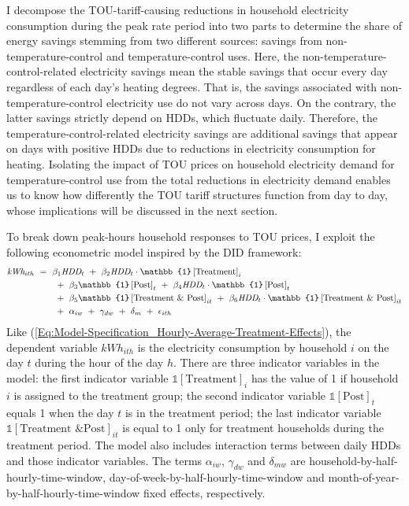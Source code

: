 I decompose the TOU-tariff-causing reductions in household electricity consumption during the peak rate period into two parts to determine the share of energy savings stemming from two different sources: savings from non-temperature-control and temperature-control uses. Here, the non-temperature-control-related electricity savings mean the stable savings that occur every day regardless of each day's heating degrees. That is, the savings associated with non-temperature-control electricity use do not vary across days. On the contrary, the latter savings strictly depend on HDDs, which fluctuate daily. Therefore, the temperature-control-related electricity savings are additional savings that appear on days with positive HDDs due to reductions in electricity consumption for heating. Isolating the impact of TOU prices on household electricity demand for temperature-control use from the total reductions in electricity demand enables us to know how differently the TOU tariff structures function from day to day, whose implications will be discussed in the next section.

To break down peak-hours household responses to TOU prices, I exploit the following econometric model inspired by the DID framework:
\begin{equation}
\begin{split}
    \textit{kWh}_{ith} \ 
    & = \ \beta_{1} \textit{HDD}_{t} \ + \ \beta_{2} \textit{HDD}_{t} \cdot \mathbb{1}\left[ \text{Treatment} \right]_{i} \\ 
    & \hspace{0.7cm} + \ \beta_{3} \mathbb{1}\left[ \text{Post} \right]_{t} \ + \ \beta_{4} \textit{HDD}_{t} \cdot \mathbb{1}\left[ \text{Post} \right]_{t} \\ 
    & \hspace{0.7cm} + \ \beta_{5} \mathbb{1}\left[ \text{Treatment \& Post} \right]_{it} \ + \ \beta_{6} \textit{HDD}_{t} \cdot \mathbb{1}\left[ \text{Treatment \& Post} \right]_{it} \\ 
    & \hspace{0.7cm} + \ \alpha_{iw} \ + \ \gamma_{dw} \ + \ \delta_{m} \ + \ \epsilon_{ith}
\end{split}
\label{Eq:Model-Specification_Breakdown-of-Hourly-Average-Treatment-Effect}
\end{equation}
Like (\ref{Eq:Model-Specification_Hourly-Average-Treatment-Effects}), the dependent variable $kWh_{ith}$ is the electricity consumption by household $i$ on the day $t$ during the hour of the day $h$. There are three indicator variables in the model: the first indicator variable $\mathbb{1}[\text{Treatment}]_{i}$ has the value of 1 if household $i$ is assigned to the treatment group; the second indicator variable $\mathbb{1}[\text{Post}]_{t}$ equals 1 when the day $t$ is in the treatment period; the last indicator variable $\mathbb{1}[\text{Treatment \& Post}]_{it}$ is equal to 1 only for treatment households during the treatment period. The model also includes interaction terms between daily HDDs and those indicator variables. The terms $\alpha_{iw}$, $\gamma_{dw}$ and $\delta_{mw}$ are household-by-half-hourly-time-window, day-of-week-by-half-hourly-time-window and month-of-year-by-half-hourly-time-window fixed effects, respectively. 

